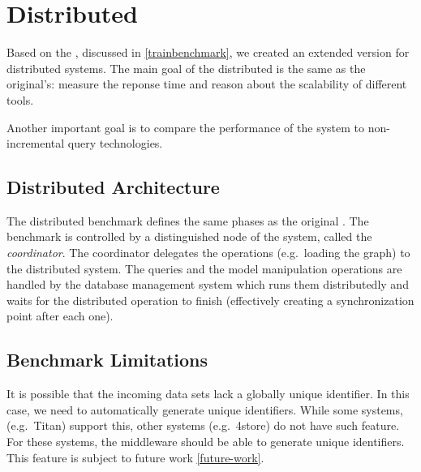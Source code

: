 

\section{Distributed \tb{}}
\label{distributed-trainbenchmark}


Based on the \tb{}, discussed in \autoref{trainbenchmark}, we created an extended version for distributed systems. The main goal of the distributed \tb{} is the same as the original's: measure the reponse time and reason about the scalability of different tools.

Another important goal is to compare the performance of the system to non-incremental query technologies.

\subsection{Distributed Architecture}

The distributed benchmark defines the same phases as the original \tb{}. The benchmark is controlled by a distinguished node of the system, called the \emph{coordinator}. The coordinator delegates the operations (e.g.\ loading the graph) to the distributed system. The queries and the model manipulation operations are handled by the database management system which runs them distributedly and waits for the distributed operation to finish (effectively creating a synchronization point after each one). 

\subsection{Benchmark Limitations}

It is possible that the incoming data sets lack a globally unique identifier. In this case, we need to automatically generate unique identifiers. While some systems, (e.g.\ Titan) support this, other systems (e.g.\ 4store) do not have such feature. For these systems, the \iqd{} middleware should be able to generate unique identifiers. This feature is subject to future work \autoref{future-work}.

